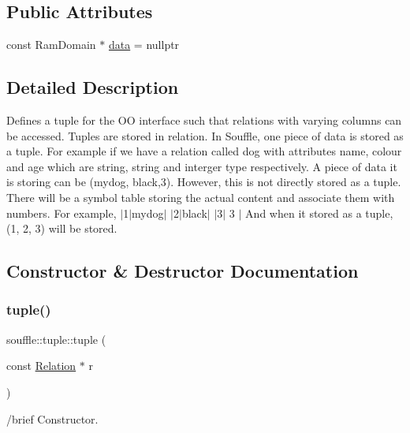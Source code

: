\subsection*{Public Attributes}
\begin{DoxyCompactItemize}
\item 
const Ram\+Domain $\ast$ \hyperlink{classsouffle_1_1tuple_a568f8cdfdd9f6d8a4c638e979a763c13}{data} = nullptr
\end{DoxyCompactItemize}


\subsection{Detailed Description}
Defines a tuple for the OO interface such that relations with varying columns can be accessed. Tuples are stored in relation. In Souffle, one piece of data is stored as a tuple. For example if we have a relation called dog with attributes name, colour and age which are string, string and interger type respectively. A piece of data it is storing can be (mydog, black,3). However, this is not directly stored as a tuple. There will be a symbol table storing the actual content and associate them with numbers. For example, $\vert$1$\vert$mydog$\vert$ $\vert$2$\vert$black$\vert$ $\vert$3$\vert$ 3 $\vert$ And when it stored as a tuple, (1, 2, 3) will be stored. 

\subsection{Constructor \& Destructor Documentation}
\mbox{\label{classsouffle_1_1tuple_a4a850c0890de15cdd2eba5c5d8f90bb6}} 
\subsubsection{\texorpdfstring{tuple()}{tuple()}\hspace{0.1cm}{\footnotesize\ttfamily [1/3]}}
{\footnotesize\ttfamily souffle\+::tuple\+::tuple (\begin{DoxyParamCaption}\item[{const \hyperlink{classsouffle_1_1_relation}{Relation} $\ast$}]{r }\end{DoxyParamCaption})\hspace{0.3cm}{\ttfamily [inline]}}

/brief Constructor.

